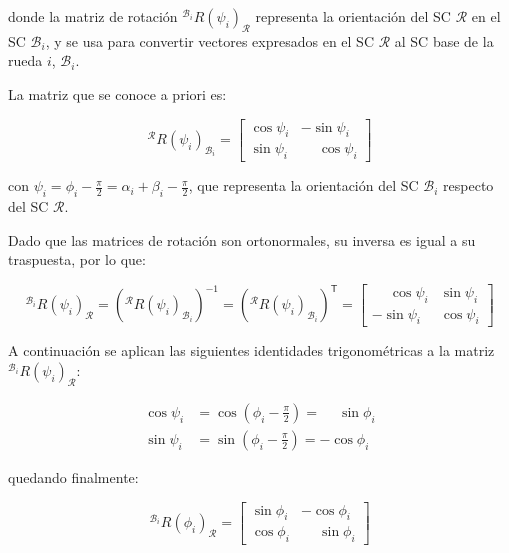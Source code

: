 \documentclass[11pt,a4paper]{article}
\newcommand{\trans}{\mathsf{T}}      %
\newcommand{\frameR}{\mathcal{R}}
\newcommand{\frameBi}{\mathcal{B}_i}
\begin{document}
donde la matriz de rotación \({}^{\frameBi}  R(\psi_i)_{\frameR}\) representa la orientación del SC \(\frameR\) en el SC \(\frameBi\), y se usa para convertir vectores expresados en el SC \(\frameR\) al SC base de la rueda \(i\), \(\frameBi\).

La matriz que se conoce a priori es:

\begin{equation}
    {}^\frameR  R(\psi_i)_{\frameBi} =
    \begin{bmatrix}
        \cos\psi_i & -\sin\psi_i           \\
        \sin\psi_i & \phantom{-}\cos\psi_i
    \end{bmatrix}
\end{equation}

con \(\psi_i = \phi_i - \frac{\pi}{2} = \alpha_i + \beta_i - \frac{\pi}{2}\), que representa la orientación del SC \(\frameBi\) respecto del SC \(\frameR\).

Dado que las matrices de rotación son ortonormales, su inversa es igual a su traspuesta, por lo que:

\begin{equation}
    {}^{\frameBi} R(\psi_i)_{\frameR} = \left({}^\frameR  R(\psi_i)_{\frameBi}\right)^{-1} = \left({}^\frameR  R(\psi_i)_{\frameBi}\right)^{\trans} =
    \begin{bmatrix}
        \phantom{-}\cos\psi_i & \sin\psi_i \\
        -\sin\psi_i           & \cos\psi_i
    \end{bmatrix}
\end{equation}

A continuación se aplican las siguientes identidades trigonométricas a la matriz \({}^{\frameBi} R(\psi_i)_{\frameR}\):

\[
    \begin{aligned}
        \cos\psi_i & = \cos\left(\phi_i - \frac{\pi}{2}\right) = \phantom{-}\sin\phi_i \\
        \sin\psi_i & = \sin\left(\phi_i - \frac{\pi}{2}\right) = -\cos\phi_i
    \end{aligned}
\]

quedando finalmente:

\begin{equation}
    {}^{\frameBi}  R(\phi_i)_{\frameR} =
    \begin{bmatrix}
        \sin\phi_i & -\cos\phi_i           \\
        \cos\phi_i & \phantom{-}\sin\phi_i
    \end{bmatrix}
\end{equation}
\end{document}
